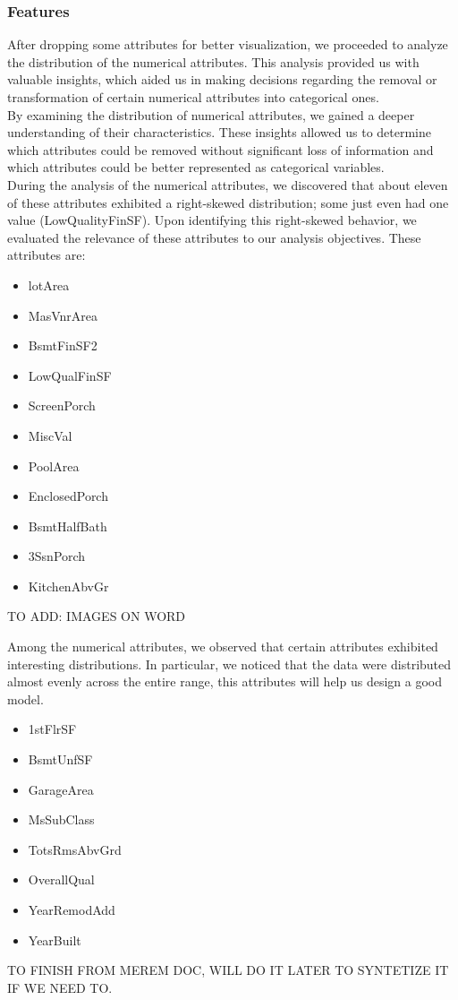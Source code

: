 \subsubsection*{Features}
After dropping some attributes for better visualization, we proceeded to analyze the distribution of the numerical attributes. This analysis provided us with valuable insights, which aided us in making decisions regarding the removal or transformation of certain numerical attributes into categorical ones. \\
By examining the distribution of numerical attributes, we gained a deeper understanding of their characteristics. These insights allowed us to determine which attributes could be removed without significant loss of information and which attributes could be better represented as categorical variables. \\
During the analysis of the numerical attributes, we discovered that about eleven of these attributes exhibited a right-skewed distribution; some just even had one value (LowQualityFinSF). Upon identifying this right-skewed behavior, we evaluated the relevance of these attributes to our analysis objectives. 
These attributes are: 
\begin{itemize}
\item lotArea 
\item MasVnrArea
\item BsmtFinSF2
\item LowQualFinSF
\item ScreenPorch
\item MiscVal
\item PoolArea
\item EnclosedPorch
\item BsmtHalfBath
\item 3SsnPorch
\item KitchenAbvGr
\end{itemize}


TO ADD: IMAGES ON WORD

Among the numerical attributes, we observed that certain attributes exhibited interesting distributions. 
In particular, we noticed that the data were distributed almost evenly across the entire range, this attributes will help us design a good model.

\begin{itemize}
\item 1stFlrSF
\item BsmtUnfSF
\item GarageArea
\item MsSubClass
\item TotsRmsAbvGrd
\item OverallQual
\item YearRemodAdd
\item YearBuilt
\end{itemize}


TO FINISH FROM MEREM DOC, WILL DO IT LATER TO SYNTETIZE IT IF WE NEED TO.

